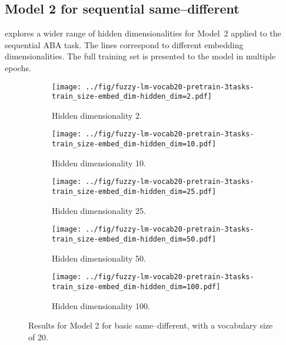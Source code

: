\newpage


\subsection{Model 2 for sequential same--different}

 explores a wider range of hidden dimensionalities for Model~2 applied to the sequential ABA task. The lines correspond to different embedding dimensionalities. The full training set is presented to the model in multiple epochs.

\begin{figure}[H]
  \centering

  \begin{subfigure}{0.45\linewidth}
    \texttt{[image: ../fig/fuzzy-lm-vocab20-pretrain-3tasks-train\_size-embed\_dim-hidden\_dim=2.pdf]}
    \caption{Hidden dimensionality 2.}
  \end{subfigure}
  \hfill
  \begin{subfigure}{0.45\linewidth}
    \texttt{[image: ../fig/fuzzy-lm-vocab20-pretrain-3tasks-train\_size-embed\_dim-hidden\_dim=10.pdf]}
    \caption{Hidden dimensionality 10.}
  \end{subfigure}

  \vspace{24pt}

  \begin{subfigure}{0.45\linewidth}
    \texttt{[image: ../fig/fuzzy-lm-vocab20-pretrain-3tasks-train\_size-embed\_dim-hidden\_dim=25.pdf]}
    \caption{Hidden dimensionality 25.}
  \end{subfigure}
  \hfill
  \begin{subfigure}{0.45\linewidth}
    \texttt{[image: ../fig/fuzzy-lm-vocab20-pretrain-3tasks-train\_size-embed\_dim-hidden\_dim=50.pdf]}
    \caption{Hidden dimensionality 50.}
  \end{subfigure}

  \vspace{24pt}

  \begin{subfigure}{0.45\linewidth}
    \texttt{[image: ../fig/fuzzy-lm-vocab20-pretrain-3tasks-train\_size-embed\_dim-hidden\_dim=100.pdf]}
    \caption{Hidden dimensionality 100.}
    \label{fig:model2-rep}
  \end{subfigure}

  \caption{Results for Model 2 for basic same--different, with a vocabulary size of 20. }
  \label{fig:model2}
\end{figure}


